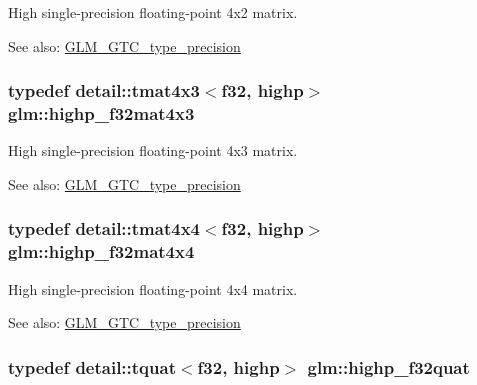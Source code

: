 High single-precision floating-point 4x2 matrix. \begin{Desc}
\item[See also:]\hyperlink{group__gtc__type__precision}{GLM\_\-GTC\_\-type\_\-precision} \end{Desc}
\hypertarget{group__gtc__type__precision_g5bd692575886422f501a379386e391d9}{
\subsubsection[highp\_\-f32mat4x3]{\setlength{\rightskip}{0pt plus 5cm}typedef detail::tmat4x3$<$f32, highp$>$ {\bf glm::highp\_\-f32mat4x3}}}
\label{group__gtc__type__precision_g5bd692575886422f501a379386e391d9}


High single-precision floating-point 4x3 matrix. \begin{Desc}
\item[See also:]\hyperlink{group__gtc__type__precision}{GLM\_\-GTC\_\-type\_\-precision} \end{Desc}
\hypertarget{group__gtc__type__precision_gfe24f12e4f5453058caea3f583ad7d9c}{
\subsubsection[highp\_\-f32mat4x4]{\setlength{\rightskip}{0pt plus 5cm}typedef detail::tmat4x4$<$f32, highp$>$ {\bf glm::highp\_\-f32mat4x4}}}
\label{group__gtc__type__precision_gfe24f12e4f5453058caea3f583ad7d9c}


High single-precision floating-point 4x4 matrix. \begin{Desc}
\item[See also:]\hyperlink{group__gtc__type__precision}{GLM\_\-GTC\_\-type\_\-precision} \end{Desc}
\hypertarget{group__gtc__type__precision_g26eef27d2efbd759e7e93c40672402e9}{
\subsubsection[highp\_\-f32quat]{\setlength{\rightskip}{0pt plus 5cm}typedef detail::tquat$<$f32, highp$>$ {\bf glm::highp\_\-f32quat}}}
\label{group__gtc__type__precision_g26eef27d2efbd759e7e93c40672402e9}



